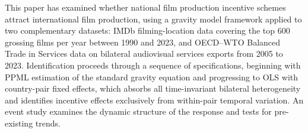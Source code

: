 %
%
%
%

This paper has examined whether national film production incentive schemes attract international film production, using a gravity model framework applied to two complementary datasets: IMDb filming-location data covering the top 600 grossing films per year between 1990 and 2023, and OECD--WTO Balanced Trade in Services data on bilateral audiovisual services exports from 2005 to 2023. Identification proceeds through a sequence of specifications, beginning with PPML estimation of the standard gravity equation and progressing to OLS with country-pair fixed effects, which absorbs all time-invariant bilateral heterogeneity and identifies incentive effects exclusively from within-pair temporal variation. An event study examines the dynamic structure of the response and tests for pre-existing trends.


